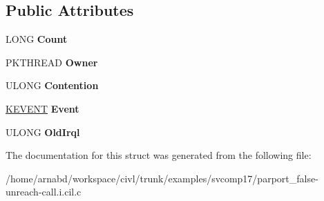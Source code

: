 \subsection*{Public Attributes}
\begin{DoxyCompactItemize}
\item 
\hypertarget{struct__FAST__MUTEX_afcba8c065bb98dfd97e90084b857cbce}{}L\+O\+N\+G {\bfseries Count}\label{struct__FAST__MUTEX_afcba8c065bb98dfd97e90084b857cbce}

\item 
\hypertarget{struct__FAST__MUTEX_a289db576cc475af0418cb61d7d636eb8}{}P\+K\+T\+H\+R\+E\+A\+D {\bfseries Owner}\label{struct__FAST__MUTEX_a289db576cc475af0418cb61d7d636eb8}

\item 
\hypertarget{struct__FAST__MUTEX_a3b187e15038ce64f18e08752256331cd}{}U\+L\+O\+N\+G {\bfseries Contention}\label{struct__FAST__MUTEX_a3b187e15038ce64f18e08752256331cd}

\item 
\hypertarget{struct__FAST__MUTEX_a17fd366cca09908cffae043c44cd74e8}{}\hyperlink{struct__KEVENT}{K\+E\+V\+E\+N\+T} {\bfseries Event}\label{struct__FAST__MUTEX_a17fd366cca09908cffae043c44cd74e8}

\item 
\hypertarget{struct__FAST__MUTEX_a388b84e85014404d69466055f0c32d4a}{}U\+L\+O\+N\+G {\bfseries Old\+Irql}\label{struct__FAST__MUTEX_a388b84e85014404d69466055f0c32d4a}

\end{DoxyCompactItemize}


The documentation for this struct was generated from the following file\+:\begin{DoxyCompactItemize}
\item 
/home/arnabd/workspace/civl/trunk/examples/svcomp17/parport\+\_\+false-\/unreach-\/call.\+i.\+cil.\+c\end{DoxyCompactItemize}
